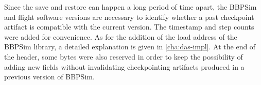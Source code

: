 {Since the save and restore can happen a long period of time apart, the BBPSim and flight software versions are necessary to identify whether a past checkpoint artifact is compatible with the current version. The timestamp and step counts were added for convenience. As for the addition of the load address of the BBPSim library, a detailed explanation is given in \autoref{cha:das-impl}. At the end of the header, some bytes were also reserved in order to keep the possibility of adding new fields without invalidating checkpointing artifacts produced in a previous version of BBPSim.

}